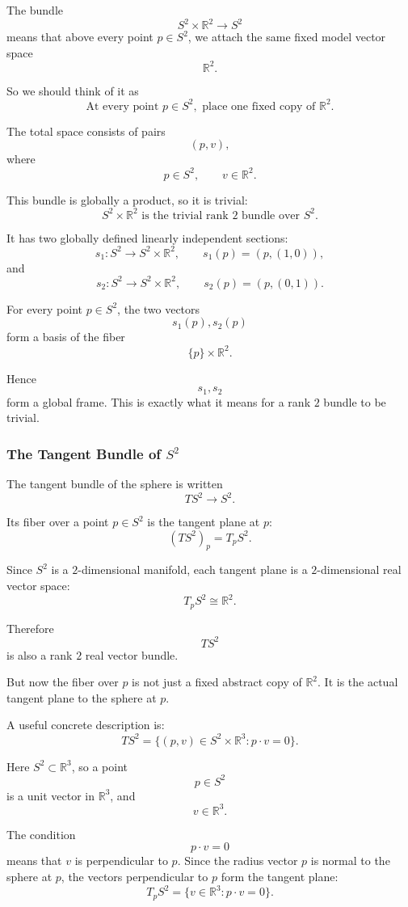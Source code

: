 \documentclass[12pt,a4paper]{article}
\theoremstyle{notespace}
\begin{document}
The bundle
\[
S^2\times \mathbb R^2\longrightarrow S^2
\]
means that above every point \(p\in S^2\), we attach the same fixed model vector space
\[
\mathbb R^2.
\]

So we should think of it as
\[
\boxed{
	\text{At every point }p\in S^2,
	\text{ place one fixed copy of }\mathbb R^2.
}
\]

The total space consists of pairs
\[
(p,v),
\]
where
\[
p\in S^2,
\qquad
v\in \mathbb R^2.
\]

This bundle is globally a product, so it is trivial:
\[
\boxed{
	S^2\times \mathbb R^2
	\text{ is the trivial rank }2\text{ bundle over }S^2.
}
\]

It has two globally defined linearly independent sections:
\[
s_1:S^2\to S^2\times \mathbb R^2,
\qquad
s_1(p)=(p,(1,0)),
\]
and
\[
s_2:S^2\to S^2\times \mathbb R^2,
\qquad
s_2(p)=(p,(0,1)).
\]

For every point \(p\in S^2\), the two vectors
\[
s_1(p),s_2(p)
\]
form a basis of the fiber
\[
\{p\}\times \mathbb R^2.
\]

Hence
\[
s_1,s_2
\]
form a global frame. This is exactly what it means for a rank \(2\) bundle to be trivial.

\subsubsection{The Tangent Bundle of \(S^2\)}

The tangent bundle of the sphere is written
\[
TS^2\longrightarrow S^2.
\]

Its fiber over a point \(p\in S^2\) is the tangent plane at \(p\):
\[
(TS^2)_p=T_pS^2.
\]

Since \(S^2\) is a \(2\)-dimensional manifold, each tangent plane is a \(2\)-dimensional real vector space:
\[
T_pS^2\cong \mathbb R^2.
\]

Therefore
\[
TS^2
\]
is also a rank \(2\) real vector bundle.

But now the fiber over \(p\) is not just a fixed abstract copy of \(\mathbb R^2\). It is the actual tangent plane to the sphere at \(p\).

A useful concrete description is:
\[
\boxed{
	TS^2=
	\{(p,v)\in S^2\times \mathbb R^3: p\cdot v=0\}.
}
\]

Here \(S^2\subset \mathbb R^3\), so a point
\[
p\in S^2
\]
is a unit vector in \(\mathbb R^3\), and
\[
v\in \mathbb R^3.
\]

The condition
\[
p\cdot v=0
\]
means that \(v\) is perpendicular to \(p\). Since the radius vector \(p\) is normal to the sphere at \(p\), the vectors perpendicular to \(p\) form the tangent plane:
\[
T_pS^2=\{v\in \mathbb R^3:p\cdot v=0\}.
\]
\end{document}
